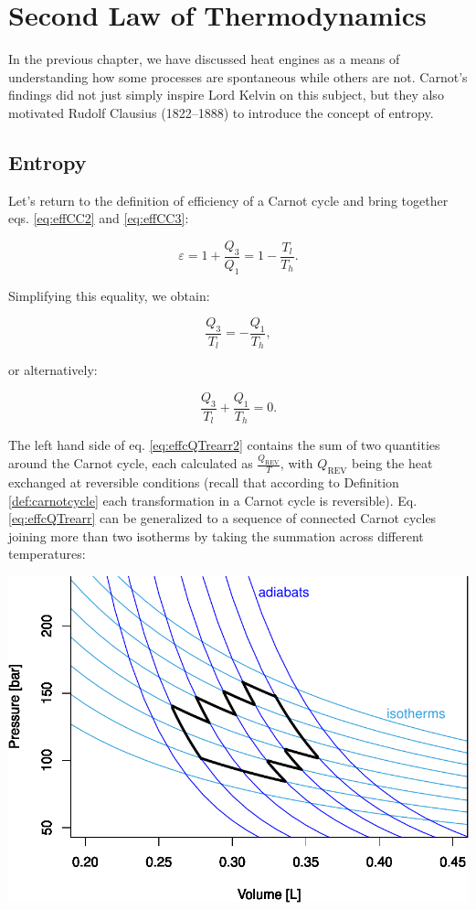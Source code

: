 \documentclass[
  9pt,
]{extbook}
\theoremstyle{definition}
\theoremstyle{definition}
\theoremstyle{definition}
\theoremstyle{remark}
\begin{document}
\hypertarget{SecondLaw}{%
\chapter{Second Law of Thermodynamics}\label{SecondLaw}}

In the previous chapter, we have discussed heat engines as a means of understanding how some processes are spontaneous while others are not. Carnot's findings did not just simply inspire Lord Kelvin on this subject, but they also motivated Rudolf Clausius (1822--1888) to introduce the concept of entropy.

\hypertarget{entropyint}{%
\section{Entropy}\label{entropyint}}

Let's return to the definition of efficiency of a Carnot cycle and bring together eqs. \eqref{eq:effCC2} and \eqref{eq:effCC3}:

\begin{equation}
\varepsilon = 1+\frac{Q_3}{Q_1} = 1-\frac{T_l}{T_h}.
\label{eq:effcQT}
\end{equation}

Simplifying this equality, we obtain:

\begin{equation}
\frac{Q_3}{T_l} = -\frac{Q_1}{T_h},
\label{eq:effcQTrearr}
\end{equation}

or alternatively:

\begin{equation}
\frac{Q_3}{T_l} + \frac{Q_1}{T_h} = 0.
\label{eq:effcQTrearr2}
\end{equation}

The left hand side of eq. \eqref{eq:effcQTrearr2} contains the sum of two quantities around the Carnot cycle, each calculated as \(\frac{Q_{\mathrm{REV}}}{T}\), with \(Q_{\mathrm{REV}}\) being the heat exchanged at reversible conditions (recall that according to Definition \ref{def:carnotcycle} each transformation in a Carnot cycle is reversible). Eq. \eqref{eq:effcQTrearr} can be generalized to a sequence of connected Carnot cycles joining more than two isotherms by taking the summation across different temperatures:

\begin{center}\includegraphics[width=0.7\linewidth]{pchem1_files/figure-latex/unnamed-chunk-12-1} \end{center}
\end{document}
